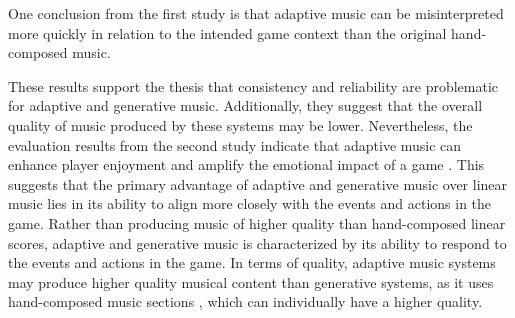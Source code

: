 One conclusion from the first study \cite{hutMcCormAms} is that adaptive music can be misinterpreted more quickly in relation to the intended game context than the original hand-composed music. 

These results support the thesis that consistency and reliability are problematic for adaptive and generative music. Additionally, they suggest that the overall quality of music produced by these systems may be lower. Nevertheless, the evaluation results from the second study indicate that adaptive music can enhance player enjoyment and amplify the emotional impact of a game \cite{plut2019music}. 
This suggests that the primary advantage of adaptive and generative music over linear music lies in its ability to align more closely with the events and actions in the game. Rather than producing music of higher quality than hand-composed linear scores, adaptive and generative music is characterized by its ability to respond to the events and actions in the game.
In terms of quality, adaptive music systems may produce higher quality musical content than generative systems, as it uses hand-composed music sections \cite{plut2020generative}, which can individually have a higher quality.

